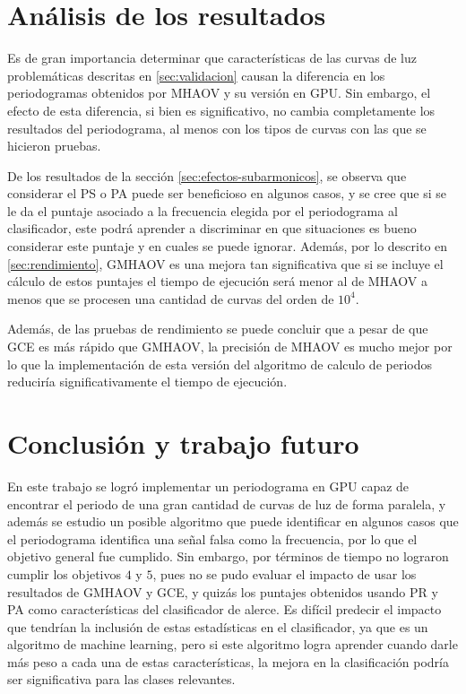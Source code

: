 \section{Análisis de los resultados}\label{sec:analisis}
Es de gran importancia determinar que características de las curvas de luz problemáticas descritas en \ref{sec:validacion} causan la diferencia en los periodogramas obtenidos por MHAOV y su versión en GPU. Sin embargo, el efecto de esta diferencia, si bien es significativo, no cambia completamente los resultados del periodograma, al menos con los tipos de curvas con las que se hicieron pruebas.

De los resultados de la sección \ref{sec:efectos-subarmonicos}, se observa que considerar el PS o PA puede ser beneficioso en algunos casos, y se cree que si se le da el puntaje asociado a la frecuencia elegida por el periodograma al clasificador, este podrá aprender a discriminar en que situaciones es bueno considerar este puntaje y en cuales se puede ignorar. Además, por lo descrito en \ref{sec:rendimiento}, GMHAOV es una mejora tan significativa que si se incluye el cálculo de estos puntajes el tiempo de ejecución será menor al de MHAOV a menos que se procesen una cantidad de curvas del orden de $10^{4}$.

Además, de las pruebas de rendimiento se puede concluir que a pesar de que GCE es más rápido que GMHAOV, la precisión de MHAOV es mucho mejor por lo que la implementación de esta versión del algoritmo de calculo de periodos reduciría significativamente el tiempo de ejecución.

\section{Conclusión y trabajo futuro}\label{sec:conclusion}
En este trabajo se logró implementar un periodograma en GPU capaz de encontrar el periodo de una gran cantidad de curvas de luz de forma paralela, y además se estudio un posible algoritmo que puede identificar en algunos casos que el periodograma identifica una señal falsa como la frecuencia, por lo que el objetivo general fue cumplido. Sin embargo, por términos de tiempo no lograron cumplir los objetivos $4$ y $5$, pues no se pudo evaluar el impacto de usar los resultados de GMHAOV y GCE, y quizás los puntajes obtenidos usando PR y PA como características del clasificador de alerce. Es difícil predecir el impacto que tendrían la inclusión de estas estadísticas en el clasificador, ya que es un algoritmo de machine learning, pero si este algoritmo logra aprender cuando darle más peso a cada una de estas características, la mejora en la clasificación podría ser significativa para las clases relevantes.

